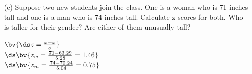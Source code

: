 \documentclass{article}
\begin{document}
\begin{flushleft}
\begin{itemize}
\item[(c)] Suppose two new students join the class. One is a woman who is 71 inches tall and one is a man who is 74 inches tall. Calculate z-scores for both. Who is taller for their gender? Are either of them unusually tall?\\

\bigskip

$\bv{\ds z = \frac{x - \bar x}{s}}$\\
\medskip
$\ds \bv{ z_w = \frac {71-63.29}{5.28} = 1.46 }$\\
\medskip
$\ds \bv{ z_m = \frac {74 - 70.24}{5.04} = 0.75}$\\
\bigskip
{}
\end{itemize}


\end{flushleft}
\end{document}

